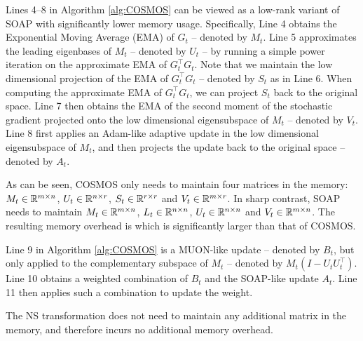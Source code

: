 \begin{remark}
Lines 4--8 in Algorithm \ref{alg:COSMOS} can be viewed as a low-rank variant of SOAP with significantly lower memory usage. Specifically, Line 4 obtains the Exponential Moving Average (EMA) of $G_t$ -- denoted by $M_t$. Line 5 approximates the leading eigenbases of $M_t$ -- denoted by $U_t$ -- by running a simple power iteration on the approximate EMA of $G_t^\top G_t$. Note that we maintain the low dimensional projection of the EMA of $G_t^\top G_t$ -- denoted by $S_t$ as in Line 6. When computing the approximate EMA of $G_t^\top G_t$, we can project $S_t$ back to the original space. Line 7 then obtains the EMA of the second moment of the stochastic gradient projected onto the low dimensional eigensubspace of $M_t$ -- denoted by $V_t$. Line 8 first applies an Adam-like adaptive update in the low dimensional eigensubspace of $M_t$, and then projects the update back to the original space -- denoted by $A_t$. 

As can be seen, COSMOS only needs to maintain four matrices in the memory: $M_t\in\mathbb{R}^{m\times n}$, $U_t\in\mathbb{R}^{n\times r}$, $S_t\in\mathbb{R}^{r\times r}$ and $V_t\in\mathbb{R}^{m\times r}$. In sharp contrast, SOAP needs to maintain $M_t\in\mathbb{R}^{m\times n}$, $L_t \in\mathbb{R}^{n\times n}$, $U_t\in\mathbb{R}^{n\times n}$ and $V_t\in\mathbb{R}^{m\times n}$. The resulting memory overhead is which is significantly larger than that of COSMOS.
\end{remark}

\begin{remark} Line 9 in Algorithm \ref{alg:COSMOS} is a MUON-like update -- denoted by $B_t$, but only applied to the complementary subspace of $M_t$ -- denoted by $M_t(I-U_tU_t^\top)$. Line 10 obtains a weighted combination of $B_t$ and the SOAP-like update $A_t$. Line 11 then applies such a combination to update the weight.

The NS transformation does not need to maintain any additional matrix in the memory, and therefore incurs no additional memory overhead.
\end{remark}

